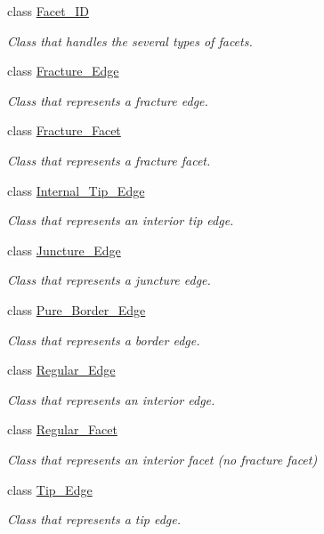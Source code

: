 \begin{DoxyCompactItemize}
class \hyperlink{classFVCode3D_1_1Rigid__Mesh_1_1Facet__ID}{Facet\+\_\+\+ID}
\begin{DoxyCompactList}\small\item\em Class that handles the several types of facets. \end{DoxyCompactList}\item 
class \hyperlink{classFVCode3D_1_1Rigid__Mesh_1_1Fracture__Edge}{Fracture\+\_\+\+Edge}
\begin{DoxyCompactList}\small\item\em Class that represents a fracture edge. \end{DoxyCompactList}\item 
class \hyperlink{classFVCode3D_1_1Rigid__Mesh_1_1Fracture__Facet}{Fracture\+\_\+\+Facet}
\begin{DoxyCompactList}\small\item\em Class that represents a fracture facet. \end{DoxyCompactList}\item 
class \hyperlink{classFVCode3D_1_1Rigid__Mesh_1_1Internal__Tip__Edge}{Internal\+\_\+\+Tip\+\_\+\+Edge}
\begin{DoxyCompactList}\small\item\em Class that represents an interior tip edge. \end{DoxyCompactList}\item 
class \hyperlink{classFVCode3D_1_1Rigid__Mesh_1_1Juncture__Edge}{Juncture\+\_\+\+Edge}
\begin{DoxyCompactList}\small\item\em Class that represents a juncture edge. \end{DoxyCompactList}\item 
class \hyperlink{classFVCode3D_1_1Rigid__Mesh_1_1Pure__Border__Edge}{Pure\+\_\+\+Border\+\_\+\+Edge}
\begin{DoxyCompactList}\small\item\em Class that represents a border edge. \end{DoxyCompactList}\item 
class \hyperlink{classFVCode3D_1_1Rigid__Mesh_1_1Regular__Edge}{Regular\+\_\+\+Edge}
\begin{DoxyCompactList}\small\item\em Class that represents an interior edge. \end{DoxyCompactList}\item 
class \hyperlink{classFVCode3D_1_1Rigid__Mesh_1_1Regular__Facet}{Regular\+\_\+\+Facet}
\begin{DoxyCompactList}\small\item\em Class that represents an interior facet (no fracture facet) \end{DoxyCompactList}\item 
class \hyperlink{classFVCode3D_1_1Rigid__Mesh_1_1Tip__Edge}{Tip\+\_\+\+Edge}
\begin{DoxyCompactList}\small\item\em Class that represents a tip edge. \end{DoxyCompactList}\end{DoxyCompactItemize}
